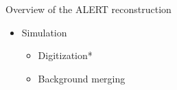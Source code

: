 \documentclass[10pt,aspectratio=43]{beamer}
\begin{document}
\begin{frame}{Overview of the ALERT reconstruction}
\begin{minipage}{0.48\textwidth}
\begin{itemize}
                \begin{itemize}
                    \item Vertex alignment**
                    \item Phi alignment**
                    \item Beamline orientation
                \end{itemize}
            \item Simulation
                \begin{itemize}
                    \item Digitization*
                    \item Background merging
                \end{itemize}
        \end{itemize}
    \end{minipage}
    

\end{frame}
\end{document}
